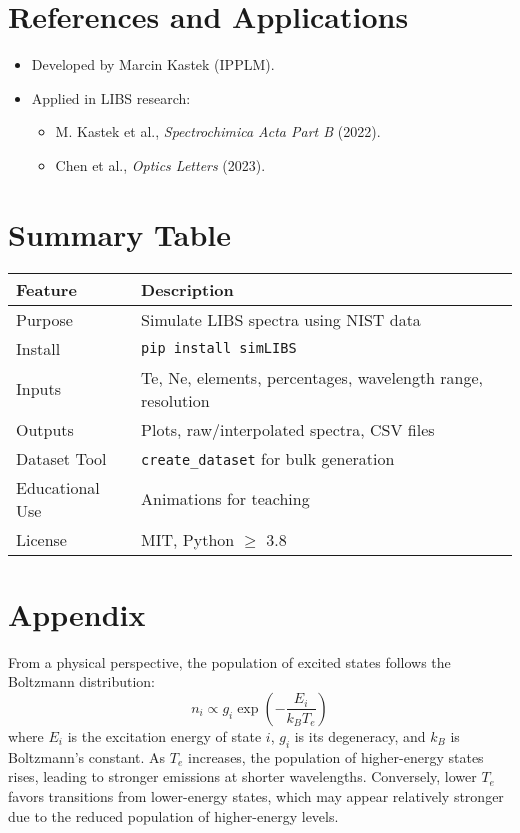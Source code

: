 \documentclass[12pt,a4paper]{article}
\begin{document}
	\section{References and Applications}
	\begin{itemize}
		\item Developed by Marcin Kastek (IPPLM).
		\item Applied in LIBS research:
		\begin{itemize}
			\item M. Kastek et al., \textit{Spectrochimica Acta Part B} (2022).
			\item Chen et al., \textit{Optics Letters} (2023).
		\end{itemize}
	\end{itemize}
	
	\section{Summary Table}
	\begin{center}
		\begin{tabular}{@{}ll@{}}
			\toprule
			\textbf{Feature} & \textbf{Description} \\
			\midrule
			Purpose & Simulate LIBS spectra using NIST data \\
			Install & \verb|pip install simLIBS| \\
			Inputs & Te, Ne, elements, percentages, wavelength range, resolution \\
			Outputs & Plots, raw/interpolated spectra, CSV files \\
			Dataset Tool & \verb|create_dataset| for bulk generation \\
			Educational Use & Animations for teaching \\
			License & MIT, Python $\geq$ 3.8 \\
			\bottomrule
		\end{tabular}
	\end{center}
	\section{Appendix}
	From a physical perspective, the population of excited states follows the Boltzmann distribution:
	\[
	n_i \propto g_i \exp\left(-\frac{E_i}{k_B T_e}\right)
	\]
	where $E_i$ is the excitation energy of state $i$, $g_i$ is its degeneracy, and $k_B$ is Boltzmann’s constant. As $T_e$ increases, the population of higher-energy states rises, leading to stronger emissions at shorter wavelengths. Conversely, lower $T_e$ favors transitions from lower-energy states, which may appear relatively stronger due to the reduced population of higher-energy levels.
	
\end{document}
